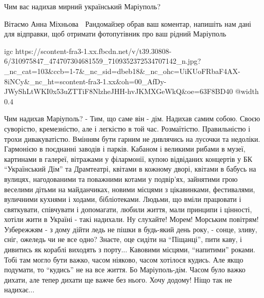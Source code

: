  
 
 
 
 

\qqSecCmt


Чим вас надихав мирний український Маріуполь?


Вітаємо Анна Міхньова 💛 Рандомайзер обрав ваш коментар, напишіть нам дані для
відправки, щоб отримати фотопутівник про ваш рідний Маріуполь

\ifcmt
  igc https://scontent-fra3-1.xx.fbcdn.net/v/t39.30808-6/310975847_474707304681559_7109352372534707142_n.jpg?_nc_cat=103&ccb=1-7&_nc_sid=dbeb18&_nc_ohc=UiKUoFRbaF4AX-8iNCy&_nc_ht=scontent-fra3-1.xx&oh=00_AfDy-JWyShLtWKI0x53uZTTiF8NlzheJHH-hvJKMXGeWkQ&oe=63F8BD40
	@width 0.4
\fi


Чим надихав Маріуполь? - Тим, що саме він - дім. Надихав самим собою. Своєю
суворістю, кремезністю, але і легкістю в той час. Розмаїтістю. Правильністю і
трохи дивакуватістю. Вмінням бути гарним не дивлячись на лусочки та недоліки.
Гармонією в поєднанні заводів і парків. Кабаном і великими рибами в музеї,
картинами в галереї, вітражами у філармонії, купою відвіданих концертів у БК
\enquote{Український Дім} та Драмтеатрі, квітами в кожному дворі, квітами в бабусь на
вулицях, нагодованими та поважними котами у подвір'ях, зайнятими грою веселими
дітьми на майданчиках, новими місцями з цікавинками, фестивалями, вуличними
кухнями і ходами, бібліотеками. Людьми, що вміли працювати і святкувати,
співчувати і допомагати, любили життя, мали принципи і цінності, хотіли жити в
Україні - такі надихали. Ну слухайте! Морем! Морським повітрям!Узбережжям - з
дому дійти ледь не пішки в будь-який день року, - сонце, зливу, сніг, ожеледь
чи не все одно? Знаєте, оце сидіти на \enquote{Піщанці}, пити каву, і дивитись як
кораблі виходять з порту... Кавовими місцями, \enquote{напитими} роками. Тобі там могло
бути важко, часом ніяково, часом хотілося кудись. Але якщо подумати, то
\enquote{кудись} не на все життя. Бо Маріуполь-дім. Часом було важко дихати, але тепер
дихати ще важче без нього. Хочу додому! Ніщо так не надихає...

